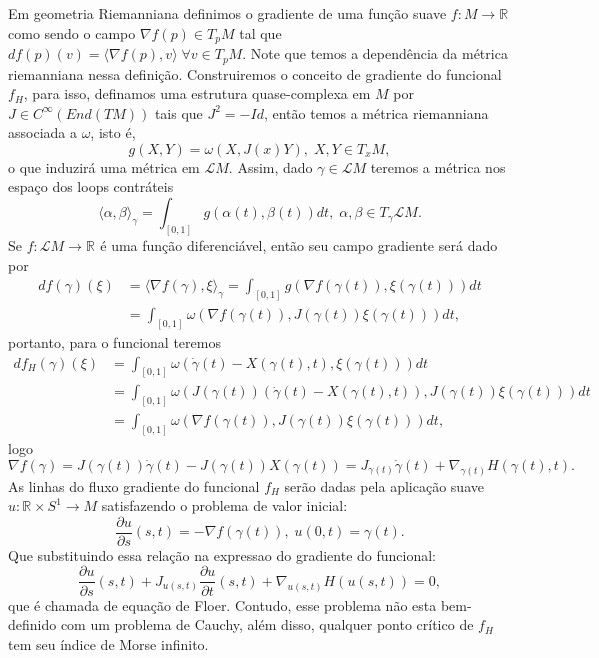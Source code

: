 \documentclass[12pt]{book}
\newcommand{\circulo}{S^{1}}
\newcommand{\derivadaparcial}[2]{\frac{\partial #1}{\partial #2}}
\newcommand{\iprod}[2]{\langle #1, #2 \rangle}
\newcommand{\retacartesianocirculo}{\real{} \times \circulo}
\newcommand{\real}[1]{\mathbb{R}^{#1}}
\newcommand{\solucoesperiodicascontrateis}{\mathcal{L}M}
\begin{document}
	Em geometria Riemanniana definimos o gradiente de uma função suave $f:M \to \real{}$ como sendo o campo $\nabla f(p) \in T_{p}M$ tal que $df(p)(v) = \iprod{ \nabla f(p)}{v}\; \forall v \in T_{p}M$. Note que temos a dependência da métrica riemanniana nessa definição. Construiremos o conceito de gradiente do funcional $f_{H}$, para isso, definamos uma estrutura quase-complexa em $M$ por $J \in C^{\infty}(End(TM))$ tais que $J^{2} = -Id$, então temos a métrica riemanniana associada a $\omega$, isto é,
	$$
	g(X, Y)= \omega(X, J(x)Y), \; X,Y \in T_{x}M,
	$$
	o que induzirá uma métrica em $\solucoesperiodicascontrateis$. Assim, dado $\gamma \in \solucoesperiodicascontrateis$ teremos a métrica nos espaço dos loops contráteis
	$$
	\iprod{\alpha}{\beta}_{\gamma} = \int_{[0,1]}g(\alpha(t), \beta(t))dt, \; \alpha, \beta \in T_{\gamma}\solucoesperiodicascontrateis.
	$$
	Se $f: \solucoesperiodicascontrateis \to \real{}$ é uma função diferenciável, então seu campo gradiente será dado por 
	$$
	\begin{aligned}
	df(\gamma)(\xi) &= \iprod{\nabla f(\gamma)}{\xi}_{\gamma} = \int_{[0,1]}g(\nabla f(\gamma(t)), \xi(\gamma(t)))dt
	\\
	&=\int_{[0,1]} \omega(\nabla f(\gamma(t)), J(\gamma(t))\xi(\gamma(t)))dt,
	\end{aligned}
	$$
	portanto, para o funcional teremos
	$$
	\begin{aligned}
	df_{H}(\gamma)(\xi) 
	&=  \int_{[0,1]} \omega(\dot{\gamma}(t) - X(\gamma(t), t), \xi(\gamma(t)))dt
	\\
	&= \int_{[0,1]} \omega(J(\gamma(t))(\dot{\gamma}(t) - X(\gamma(t), t)), J(\gamma(t))\xi(\gamma(t)))dt
	\\
	&= \int_{[0,1]} \omega(\nabla f(\gamma(t)), J(\gamma(t))\xi(\gamma(t)))dt,
	\end{aligned}
	$$
	logo 
	$$
	\nabla f(\gamma) = J(\gamma(t))\dot{\gamma}(t) - J(\gamma(t)) X(\gamma(t)) =J_{\gamma(t)}\dot{\gamma}(t) + \nabla_{\gamma(t)}H(\gamma(t), t).  
	$$
	As linhas do fluxo gradiente do funcional $f_{H}$ serão dadas pela aplicação suave $u : \retacartesianocirculo \to M$ satisfazendo o problema de valor inicial:
	$$
	\derivadaparcial{u}{s}(s,t) = -\nabla f(\gamma(t)), \; u(0,t) = \gamma(t).
	$$
	Que substituindo essa relação na expressao do gradiente do funcional:
	$$
	\derivadaparcial{u}{s}(s,t) + J_{u(s,t)}\derivadaparcial{u}{t}(s,t) + \nabla_{u(s,t)}H(u(s,t))=0, 
	$$
	que é chamada de equação de Floer. Contudo, esse problema não esta bem-definido com um problema de Cauchy, além disso, qualquer ponto crítico de $f_{H}$ tem seu índice de Morse infinito.
	
\end{document}
